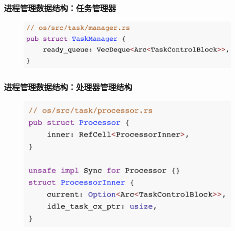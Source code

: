 \begin{frame}[fragile]
    \frametitle{进程管理数据结构：\href{https://rcore-os.github.io/rCore-Tutorial-Book-v3/chapter5/2core-data-structures.html\#id8}{任务管理器}}
% 
	\begin{figure}
		\centering
		\includegraphics[width=0.7\linewidth]{figs/task.png}
	\end{figure}



% 
\end{frame}
\begin{frame}[fragile]
    \frametitle{进程管理数据结构：\href{https://rcore-os.github.io/rCore-Tutorial-Book-v3/chapter5/2core-data-structures.html\#id8}{处理器管理结构}}
% 
	\begin{figure}
		\centering
		\includegraphics[width=0.7\linewidth]{figs/processor.png}
	\end{figure}



% 
% 
\end{frame}
